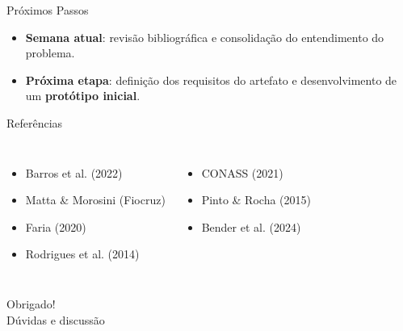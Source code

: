 ﻿\documentclass[aspectratio=169]{beamer}
\begin{document}
\begin{frame}{Pr\'oximos Passos}
  \begin{itemize}
    \item \textbf{Semana atual}: revis\~ao bibliogr\'afica e consolida\c{c}\~ao do entendimento do problema.
    \item \textbf{Pr\'oxima etapa}: defini\c{c}\~ao dos requisitos do artefato e desenvolvimento de um \textbf{prot\'otipo inicial}.
  \end{itemize}
\end{frame}

\begin{frame}{Refer\^encias}
  \begin{columns}[T]
    \begin{itemize}
      \item Barros et al. (2022)
      \item Matta \& Morosini (Fiocruz)
      \item Faria (2020)
      \item Rodrigues et al. (2014)
    \end{itemize}
    \begin{itemize}
      \item CONASS (2021)
      \item Pinto \& Rocha (2015)
      \item Bender et al. (2024)
    \end{itemize}
  \end{columns}
\end{frame}

\begin{frame}{}
  \centering
  \vspace{1cm}
  {\Huge Obrigado!}\\[1em]
  {\large D\'uvidas e discuss\~ao}
\end{frame}
\end{document}
